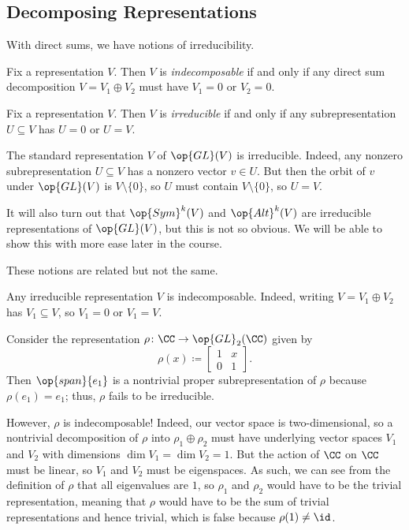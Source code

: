 \documentclass[../notes.tex]{subfiles}
\begin{document}
\subsection{Decomposing Representations}
With direct sums, we have notions of irreducibility.
\begin{definition}[indecomposable]
	Fix a representation $V$. Then $V$ is \textit{indecomposable} if and only if any direct sum decomposition $V=V_1\oplus V_2$ must have $V_1=0$ or $V_2=0$.
\end{definition}
\begin{definition}[irreducible]
	Fix a representation $V$. Then $V$ is \textit{irreducible} if and only if any subrepresentation $U\subseteq V$ has $U=0$ or $U=V$.
\end{definition}
\begin{example}
	The standard representation $V$ of $\op{GL}(V)$ is irreducible. Indeed, any nonzero subrepresentation $U\subseteq V$ has a nonzero vector $v\in U$. But then the orbit of $v$ under $\op{GL}(V)$ is $V\setminus\{0\}$, so $U$ must contain $V\setminus\{0\}$, so $U=V$.

	It will also turn out that $\op{Sym}^k(V)$ and $\op{Alt}^k(V)$ are irreducible representations of $\op{GL}(V)$, but this is not so obvious. We will be able to show this with more ease later in the course.
\end{example}
These notions are related but not the same.
\begin{remark}
	Any irreducible representation $V$ is indecomposable. Indeed, writing $V=V_1\oplus V_2$ has $V_1\subseteq V$, so $V_1=0$ or $V_1=V$.
\end{remark}
\begin{example}
	Consider the representation $\rho\colon\CC\to\op{GL}_2(\CC)$ given by
	\[\rho(x)\coloneqq\begin{bmatrix}
		1 & x \\ 0 & 1
	\end{bmatrix}.\]
	Then $\op{span}\{e_1\}$ is a nontrivial proper subrepresentation of $\rho$ because $\rho(e_1)=e_1$; thus, $\rho$ fails to be irreducible.
	
	However, $\rho$ is indecomposable! Indeed, our vector space is two-dimensional, so a nontrivial decomposition of $\rho$ into $\rho_1\oplus\rho_2$ must have underlying vector spaces $V_1$ and $V_2$ with dimensions $\dim V_1=\dim V_2=1$. But the action of $\CC$ on $\CC$ must be linear, so $V_1$ and $V_2$ must be eigenspaces. As such, we can see from the definition of $\rho$ that all eigenvalues are $1$, so $\rho_1$ and $\rho_2$ would have to be the trivial representation, meaning that $\rho$ would have to be the sum of trivial representations and hence trivial, which is false because $\rho(1)\ne\id$.
\end{example}
\end{document}

